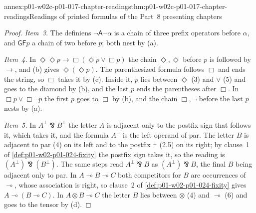 \begin{annexitem}{annex:p01-w02c-p01-017-chapter-readings}{thm:p01-w02c-p01-017-chapter-readings}{Readings of printed formulas of the Part~8 presenting chapters}
\begin{proof}
\emph{Item~3.}  The definiens \(\neg\mathsf A\neg\alpha\) is a chain of
three prefix operators before \(\alpha\), and \(\mathsf G\mathsf Fp\) a
chain of two before \(p\); both nest by (a).

\emph{Item~4.}  In \(\Diamond\Diamond p\to\Box(\Diamond p\lor\Box p)\) the
chain \(\Diamond,\Diamond\) before \(p\) is followed by \(\to\), and (b)
gives \(\Diamond(\Diamond p)\).  The parenthesized formula follows
\(\Box\) and ends the string, so \(\Box\) takes it by (c).  Inside it,
\(p\) lies between \(\Diamond\) (3) and \(\lor\) (5) and goes to the
diamond by (b), and the last \(p\) ends the parentheses after \(\Box\).
In \(\Box p\lor\Box\neg p\) the first \(p\) goes to \(\Box\) by (b), and
the chain \(\Box,\neg\) before the last \(p\) nests by (a).

\emph{Item~5.}  In \(A^\perp\bindnasrepma B^\perp\) the letter \(A\) is
adjacent only to the postfix sign that follows it, which takes it, and
the formula \(A^\perp\) is the left operand of par.  The letter \(B\) is
adjacent to par (4) on its left and to the postfix \({}^\perp\) (2.5) on
its right; by clause~1 of \cref{def:p01-w02-p01-024-fixity} the postfix
sign takes it, so the reading is \((A^\perp)\bindnasrepma(B^\perp)\).  The
same steps read \(A^\perp\bindnasrepma B\) as \((A^\perp)\bindnasrepma
B\), the final \(B\) being adjacent only to par.  In
\(A\multimap B\multimap C\) both competitors for \(B\) are occurrences of
\(\multimap\), whose association is right, so clause~2 of
\cref{def:p01-w02-p01-024-fixity} gives \(A\multimap(B\multimap C)\).  In
\(A\otimes B\multimap C\) the letter \(B\) lies between \(\otimes\) (4)
and \(\multimap\) (6) and goes to the tensor by (d).
\end{proof}
\end{annexitem}


